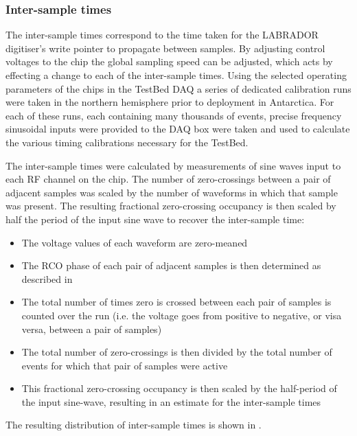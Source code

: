 \subsubsection{Inter-sample times}
\label{sec:calibration:LABRADOR-Digitiser-Chip:Inter-sample-times}

The inter-sample times correspond to the time taken for the LABRADOR digitiser's write pointer to propagate between samples. By adjusting control voltages to the chip the global sampling speed can be adjusted, which acts by effecting a change to each of the inter-sample times. Using the selected operating parameters of the chips in the TestBed DAQ a series of dedicated calibration runs were taken in the northern hemisphere prior to deployment in Antarctica. For each of these runs, each containing many thousands of events,  precise frequency sinusoidal inputs were provided to the DAQ box were taken and used to calculate the various timing calibrations necessary for the TestBed. 

The inter-sample times were calculated by measurements of sine waves input to each RF channel on the chip. The number of zero-crossings between a pair of adjacent samples was scaled by the number of waveforms in which that sample was present. The resulting fractional zero-crossing occupancy is then scaled by half the period of the input sine wave to recover the inter-sample time:

\begin{itemize}
\item The voltage values of each waveform are zero-meaned 
\item The RCO phase of each pair of adjacent samples is then determined as described in 
\item The total number of times zero is crossed between each pair of samples is counted over the run (i.e. the voltage goes from positive to negative, or visa versa, between a pair of samples)
\item The total number of zero-crossings is then divided by the total number of events for which that pair of samples were active
\item This fractional zero-crossing occupancy is then scaled by the half-period of the input sine-wave, resulting in an estimate for the inter-sample times
\end{itemize}


The resulting distribution of inter-sample times is shown in . 

